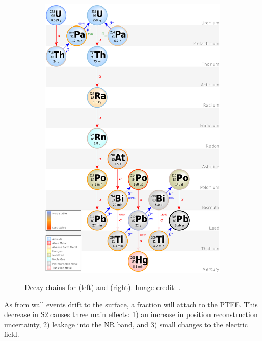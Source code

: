 \begin{figure}
\begin{subfigure}[t]{0.5\textwidth}
    \end{subfigure}%
    \begin{subfigure}[t]{0.5\textwidth}
        \centering
        \includegraphics[width=\textwidth]{Decay_Chain_of_Uranium-238}
    \end{subfigure}
    \caption{Decay chains for  (left) and  (right).  Image credit: .}
	\label{fig:backgrounds_decay_chains}
\end{figure}

As \electron from wall events drift to the surface, a fraction will attach to the PTFE.  This decrease in S2 causes three main effects: 1)
an increase in position reconstruction uncertainty, 2) leakage into the NR band, and 3) small changes to the electric field.

